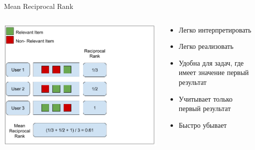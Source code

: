 \documentclass[11pt,aspectratio=169,handout]{beamer}
\begin{document}
\begin{frame}{Mean Reciprocal Rank}

\begin{columns}
\begin{column}{0.5\textwidth}
   \begin{center}
		\includegraphics[scale=0.3]{images/mrr.png}
   \end{center}
\end{column}
\begin{column}{0.4\textwidth}
    \begin{tcolorbox}[colback=info!5,colframe=info!80,title=]
      \begin{itemize}
      \item Легко интерпретировать
      \item Легко реализовать
      \item Удобна для задач, где имеет значение первый результат
      \end{itemize}
    \end{tcolorbox}
    \begin{tcolorbox}[colback=warn!5,colframe=warn!80,title=]
      \begin{itemize}
      \item Учитывает только первый результат
      \item Быстро убывает
      \end{itemize}
    \end{tcolorbox}
\end{column}
\end{columns}

\end{frame}
\end{document}
